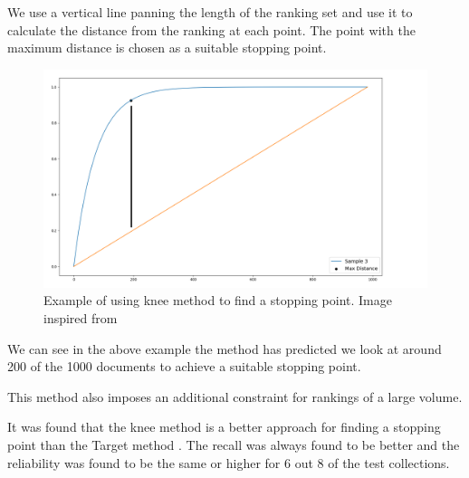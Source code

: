 We use a vertical line panning the length of the ranking set and use it to calculate the distance from the ranking at each point. The point with the maximum distance is chosen as a suitable stopping point.

\begin{figure}[H]
\center
\includegraphics[width=13cm]{figures/knee.png}
\caption{Example of using knee method to find a stopping point. Image inspired from \cite{Satopa11}}
\end{figure}

We can see in the above example the method has predicted we look at around 200 of the 1000 documents to achieve a suitable stopping point.

This method also imposes an additional constraint for rankings of a large volume. 

It was found that the knee method is a better approach for finding a stopping point than the Target method \cite{Cormack2016}. The recall was always found to be better and the reliability was found to be the same or higher for 6 out 8 of the test collections.



